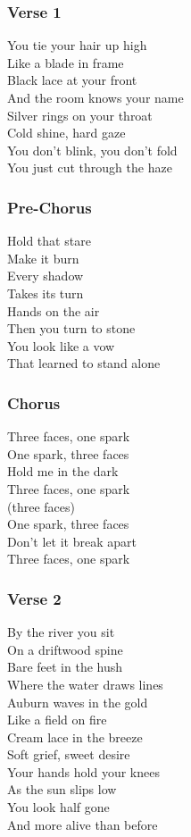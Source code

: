 \subsubsection{Verse 1}\label{verse-1-17}

You tie your hair up high\\
Like a blade in frame\\
Black lace at your front\\
And the room knows your name\\
Silver rings on your throat\\
Cold shine, hard gaze\\
You don't blink, you don't fold\\
You just cut through the haze

\subsubsection{Pre-Chorus}\label{pre-chorus-25}

Hold that stare\\
Make it burn\\
Every shadow\\
Takes its turn\\
Hands on the air\\
Then you turn to stone\\
You look like a vow\\
That learned to stand alone

\subsubsection{Chorus}\label{chorus-44}

Three faces, one spark\\
One spark, three faces\\
Hold me in the dark\\
Three faces, one spark\\
(three faces)\\
One spark, three faces\\
Don't let it break apart\\
Three faces, one spark

\subsubsection{Verse 2}\label{verse-2-17}

By the river you sit\\
On a driftwood spine\\
Bare feet in the hush\\
Where the water draws lines\\
Auburn waves in the gold\\
Like a field on fire\\
Cream lace in the breeze\\
Soft grief, sweet desire\\
Your hands hold your knees\\
As the sun slips low\\
You look half gone\\
And more alive than before

